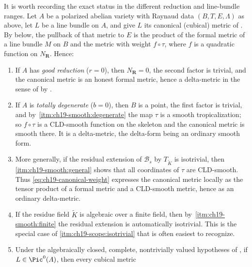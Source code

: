 \begin{remark}
\label{rem:ch19-canonical-delta-scope}
It is worth recording the exact status in the different reduction and
line-bundle ranges.  Let $A$ be a
polarized abelian variety with Raynaud data $(B,T,E,\Lambda)$ as above,
let $L$ be a line bundle on $A$, and give $L$ its canonical
(cubical) metric of .  By
 below, the pullback of that metric to
$E$ is the product of the formal metric of a line bundle $M$ on $B$
and the metric with weight $f\circ\tau$, where $f$ is a quadratic
function on $N_{\mathbf R}$.  Hence:
\begin{enumerate}
\item\label{itm:ch19-scope:good} If $A$ has \emph{good reduction}
 ($r=0$), then $N_{\mathbf R}=0$, the second factor is trivial, and the
 canonical metric is an honest formal metric, hence a delta-metric in the
 sense of  by \cite[Proposition~8.11]{GK17}.
\item\label{itm:ch19-scope:degenerate} If $A$ is \emph{totally
 degenerate} ($b=0$), then $B$ is a point, the first factor is trivial,
 and by
 \,\cref{itm:ch19-smooth:degenerate} the map
 $\tau$ is a smooth tropicalization; so $f\circ\tau$ is a CLD-smooth
 function on the skeleton and the canonical metric is smooth there.  It is a
 delta-metric, the delta-form being an ordinary smooth form.
\item\label{itm:ch19-scope:isotrivial} More generally, if the residual
 extension of $\mathcal B_s$ by $T_{\widetilde K}$ is isotrivial, then
 \,\cref{itm:ch19-smooth:general} shows that all
 coordinates of $\tau$ are CLD-smooth.  Thus
 \eqref{eq:ch19-canonical-weight} expresses the canonical metric locally as
 the tensor product of a formal metric and a CLD-smooth metric, hence as an
 ordinary delta-metric.
\item\label{itm:ch19-scope:finite} If the residue field $\widetilde K$ is
 algebraic over a finite field, then by
 \,\cref{itm:ch19-smooth:finite} the residual
 extension is automatically isotrivial.  This is the special case of
 \cref{itm:ch19-scope:isotrivial} that is often easiest to recognize.
\item\label{itm:ch19-scope:piczero} Under the algebraically closed,
 complete, nontrivially valued hypotheses of
 , if $L\in\Pic^0(A)$, then every cubical metric

\end{enumerate}
\end{remark}
